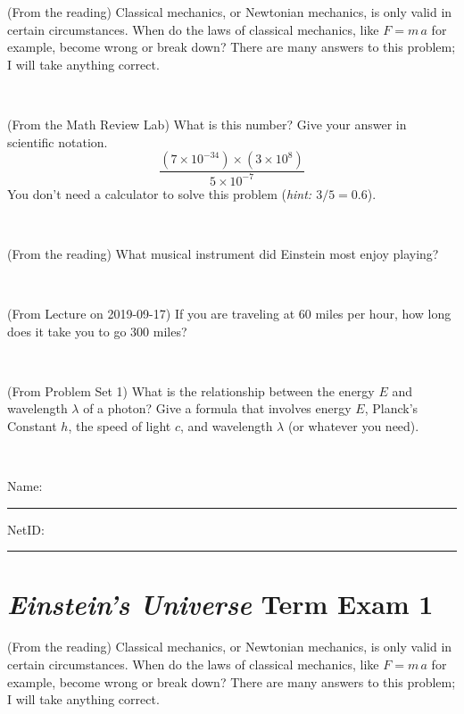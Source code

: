 \documentclass[12pt, letterpaper]{article}
\begin{document}
\begin{problem} (From the reading)
Classical mechanics, or Newtonian mechanics, is only valid in certain
circumstances. When do the laws of classical mechanics, like $F =
m\,a$ for example, become wrong or break down? There are many answers
to this problem; I will take anything correct.
\end{problem}


\vfill ~


\clearpage


\begin{problem} (From the Math Review Lab)
What is this number? Give your answer in scientific notation.
$$
\frac{(7\times10^{-34})\times(3\times10^8)}{5\times10^{-7}}
$$
You don't need a calculator to solve this problem (\textit{hint: $3/5=0.6$}).
\end{problem}


\vfill ~

\begin{problem} (From the reading)
What musical instrument did Einstein most enjoy playing?
\end{problem}


\vfill ~

\begin{problem} (From Lecture on 2019-09-17)
If you are traveling at 60 miles per hour, how long does
it take you to go 300 miles?
\end{problem}


\vfill ~

\begin{problem} (From Problem Set 1)
What is the relationship between the energy $E$ and wavelength
$\lambda$ of a photon? Give a formula that involves energy $E$,
Planck's Constant $h$, the speed of light $c$, and wavelength
$\lambda$ (or whatever you need).
\end{problem}

\vfill ~


\cleardoublepage



\noindent
Name: \rule[-1ex]{0.60\textwidth}{0.1pt}
NetID: \rule[-1ex]{0.20\textwidth}{0.1pt}

\section*{\textsl{Einstein's Universe} Term Exam 1}
\setcounter{problem}{1}


\begin{problem} (From the reading)
Classical mechanics, or Newtonian mechanics, is only valid in certain
circumstances. When do the laws of classical mechanics, like $F =
m\,a$ for example, become wrong or break down? There are many answers
to this problem; I will take anything correct.
\end{problem}
\end{document}
